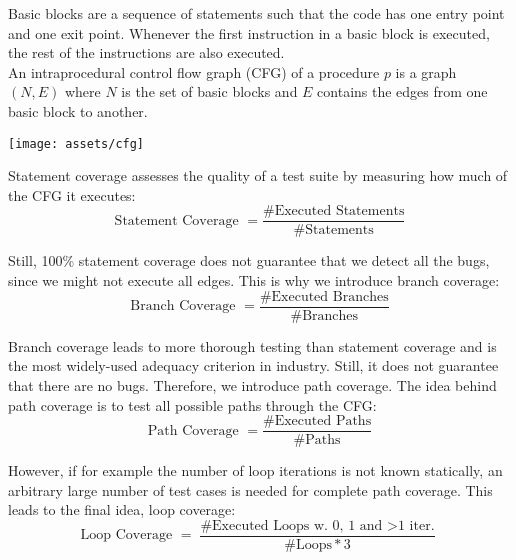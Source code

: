 Basic blocks are a sequence of statements such that the code has one entry point and one exit point. Whenever the first instruction in a basic block is executed, the rest of the instructions are also executed. \\

An intraprocedural control flow graph (CFG) of a procedure $p$ is a graph $(N,E)$ where $N$ is the set of basic blocks and $E$ contains the edges from one basic block to another.

\begin{center}
	\texttt{[image: assets/cfg]}
\end{center}

Statement coverage assesses the quality of a test suite by measuring how much of the CFG it executes:
$$\text{Statement Coverage } = \frac{\text{\#Executed Statements}}{\text{\#Statements}}$$

Still, 100\% statement coverage does not guarantee that we detect all the bugs, since we might not execute all edges. This is why we introduce branch coverage:
$$\text{Branch Coverage } = \frac{\text{\#Executed Branches}}{\text{\#Branches}}$$

Branch coverage leads to more thorough testing than statement coverage and is the most widely-used adequacy criterion in industry. Still, it does not guarantee that there are no bugs. Therefore, we introduce path coverage. The idea behind path coverage is to test all possible paths through the CFG:
\vspace{-5pt}
$$\text{Path Coverage } = \frac{\text{\#Executed Paths}}{\text{\#Paths}}$$

However, if for example the number of loop iterations is not known statically, an arbitrary large number of test cases is needed for complete path coverage. This leads to the final idea, loop coverage:
$$\text{Loop Coverage } = \frac{\text{\#Executed Loops w. 0, 1 and $>$1 iter.}}{\text{\#Loops} * 3}$$
\vspace{-25pt}
